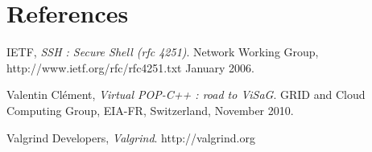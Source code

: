 \documentclass[a4paper, 11pt]{article}
\begin{document}
\section{References}
\begin{thebibliography}{9}

	IETF,
  	\emph{SSH : Secure Shell (rfc 4251)}.
	Network Working Group, http://www.ietf.org/rfc/rfc4251.txt
	January 2006.
	
	Valentin Clément,
  	\emph{Virtual POP-C++ : road to ViSaG}. GRID and Cloud Computing Group, EIA-FR, Switzerland, November 2010.
  	
	Valgrind Developers,
  	\emph{Valgrind}. http://valgrind.org

\end{thebibliography}
\end{document}
